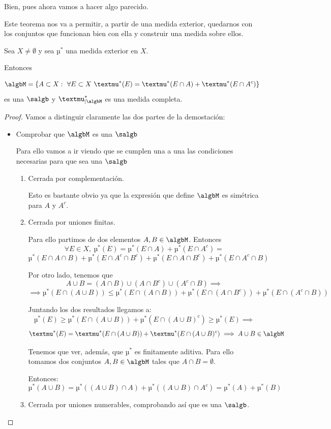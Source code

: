 \documentclass{apuntes}
\begin{document}
Bien, pues ahora vamos a hacer algo parecido.
\begin{theorem}
Este teorema nos va a permitir, a partir de una medida exterior, quedarnos con los conjuntos que funcionan bien con ella y construir una medida sobre ellos.

Sea $X \neq \emptyset$ y sea $µ^*$ una medida exterior en $X$.

Entonces

\[\algbM = \{A \subset X: \ \forall E \subset X \ µ^*(E)=µ^*(E \cap A) + µ^*(E \cap A^c)\}\]
es una $\salgb$ y $µ^*_{|\algbM}$ es una medida completa.
\end{theorem}
\begin{proof}
Vamos a distinguir claramente las dos partes de la demostación:
\begin{itemize}
\item Comprobar que $\algbM$ es una $\salgb$

Para ello vamos a ir viendo que se cumplen una a una las condiciones necesarias para que sea una $\salgb$
\begin{enumerate}
\item Cerrada por complementación.

Esto es bastante obvio ya que la expresión que define $\algbM$ es simétrica para $A$ y $A^c$.

\item Cerrada por uniones finitas.

Para ello partimos de dos elementos $A,B\in \algbM$. Entonces
\[\forall E \in X, \ µ^*(E)=µ^*(E \cap A)+µ^*(E \cap A^c) = \]
\[µ^*(E \cap A\cap B)+µ^*(E \cap A^c \cap B^c)+µ^*(E \cap A \cap B^c)+µ^*(E \cap A^c \cap B)\]

Por otro lado, tenemos que
\[A \cup B = (A\cap B)\cup(A\cap B^c)\cup (A^c \cap B) \implies\]
\[\implies µ^*(E\cap (A\cup B)) \leq µ^*(E \cap (A \cap B))+µ^*(E \cap (A \cap B^c))+µ^*(E \cap (A^c \cap B))\]

Juntando los dos resultados llegamos a:
\[µ^*(E) \geq µ^*(E \cap (A \cup B))+µ^*(E \cap (A \cup B)^c)\geq µ^*(E) \implies\]
\[µ^*(E) = µ^*(E \cap (A \cup B))+µ^*(E \cap (A \cup B)^c) \implies  A \cup B \in \algbM\]


Tenemos que ver, además, que $µ^*$ es finitamente aditiva. Para ello tomamos dos conjuntos $A, B \in \algbM$ tales que $A \cap B = \emptyset$.

Entonces:
\[µ^*(A \cup B) = µ^*((A \cup B) \cap A) + µ^*((A \cup B) \cap A^c)= µ^*(A)+µ^*(B)\]

\item Cerrada por uniones numerables, comprobando así que es una $\salgb$.


\end{enumerate}
\end{itemize}
\end{proof}
\end{document}
